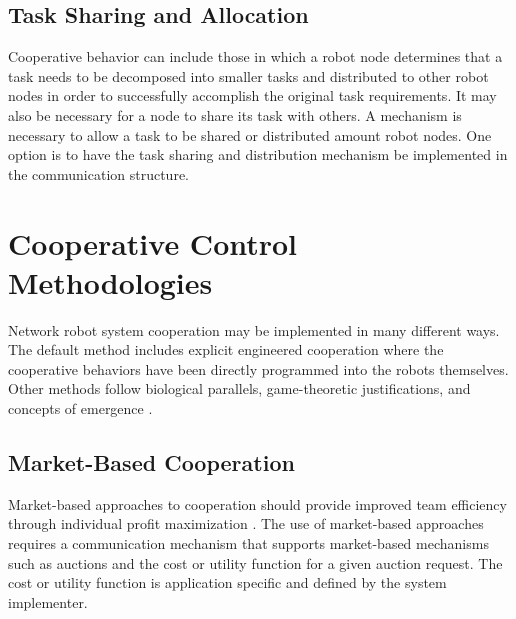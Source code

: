     \subsection{Task Sharing and Allocation}
      Cooperative behavior can include those in which a robot node determines 
        that a task needs to be decomposed into smaller tasks and distributed 
        to other robot nodes in order to successfully accomplish the original 
        task requirements.
      It may also be necessary for a node to share its task with others.
      A mechanism is necessary to allow a task to be shared or distributed
        amount robot nodes.
      One option is to have the task sharing and distribution mechanism be 
        implemented in the communication structure.


  \section{Cooperative Control Methodologies}

     Network robot system cooperation may be implemented in many different ways.
     The default method includes explicit engineered cooperation where the
       cooperative behaviors have been directly programmed into the robots themselves.
     Other methods follow biological parallels, game-theoretic justifications,
       and concepts of emergence \cite{Cao1997}.
   
    \subsection{Market-Based Cooperation}

      Market-based approaches to cooperation should provide improved team 
        efficiency through individual profit maximization \cite{Dias2006}.
      The use of market-based approaches requires a communication mechanism that 
        supports market-based mechanisms such as auctions and the cost or 
        utility function for a given auction request.
      The cost or utility function is application specific and defined by the 
        system implementer.
        
